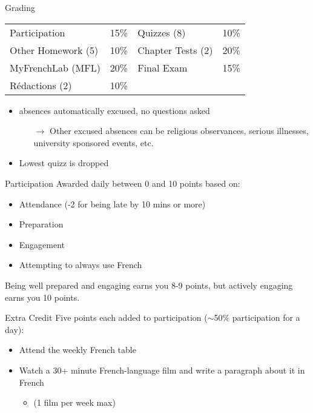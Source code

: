 \begin{frame}{Grading}
  \begin{center}
    \begin{tabular}{l l | l l}
      Participation      & 15\% & Quizzes (8)       & 10\% \\
      Other Homework (5) & 10\% & Chapter Tests (2) & 20\% \\
      MyFrenchLab (MFL)  & 20\% & Final Exam        & 15\% \\
      Rédactions (2)     & 10\% &                   &
    \end{tabular}
  \end{center}
  \begin{itemize}
    \item \absences{} absences automatically excused, no questions asked
    \begin{itemize}
      \item[$\to$] Other excused absences can be religious observances, serious illnesses, university sponsored events, etc.
    \end{itemize}
    \item Lowest quizz is dropped
  \end{itemize}
\end{frame}

\begin{frame}{Participation}
  Awarded daily between 0 and 10 points based on:
  \begin{itemize}
    \item Attendance (-2 for being late by 10 mins or more)
    \item Preparation
    \item Engagement
    \item Attempting to always use French
  \end{itemize}
  Being well prepared and engaging earns you 8-9 points, but \alert{actively} engaging earns you 10 points.
\end{frame}

\begin{frame}{Extra Credit}
  Five points each added to participation ($\sim$50\% participation for a day):
  \begin{itemize}
    \item Attend the weekly French table
    \item Watch a 30+ minute French-language film and write a paragraph about it \alert{in French}
    \begin{itemize}
      \item (1 film per week max)
    \end{itemize}
  \end{itemize}
\end{frame}

